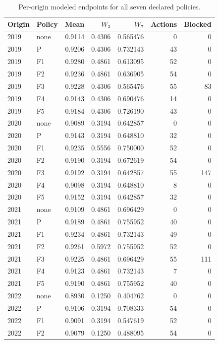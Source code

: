 \begin{table}[!tbp]
\centering
\caption{Per-origin modeled endpoints for all seven declared policies.}\label{sup:r2-perorigin}
\scriptsize
\setlength{\tabcolsep}{4pt}
\begin{tabular}{@{}llrrrrr@{}}
\toprule
Origin & Policy & Mean & $W_3$ & $W_7$ & Actions & Blocked \\
\midrule
2019 & none & 0.9114 & 0.4306 & 0.565476 & 0 & 0 \\
2019 & P & 0.9206 & 0.4306 & 0.732143 & 43 & 0 \\
2019 & F1 & 0.9280 & 0.4861 & 0.613095 & 52 & 0 \\
2019 & F2 & 0.9236 & 0.4861 & 0.636905 & 54 & 0 \\
2019 & F3 & 0.9228 & 0.4306 & 0.565476 & 55 & 83 \\
2019 & F4 & 0.9143 & 0.4306 & 0.690476 & 14 & 0 \\
2019 & F5 & 0.9184 & 0.4306 & 0.726190 & 43 & 0 \\
2020 & none & 0.9089 & 0.3194 & 0.642857 & 0 & 0 \\
2020 & P & 0.9143 & 0.3194 & 0.648810 & 32 & 0 \\
2020 & F1 & 0.9235 & 0.5556 & 0.750000 & 52 & 0 \\
2020 & F2 & 0.9190 & 0.3194 & 0.672619 & 54 & 0 \\
2020 & F3 & 0.9192 & 0.3194 & 0.642857 & 55 & 147 \\
2020 & F4 & 0.9098 & 0.3194 & 0.648810 & 8 & 0 \\
2020 & F5 & 0.9152 & 0.3194 & 0.642857 & 32 & 0 \\
2021 & none & 0.9109 & 0.4861 & 0.696429 & 0 & 0 \\
2021 & P & 0.9189 & 0.4861 & 0.755952 & 40 & 0 \\
2021 & F1 & 0.9234 & 0.4861 & 0.732143 & 49 & 0 \\
2021 & F2 & 0.9261 & 0.5972 & 0.755952 & 52 & 0 \\
2021 & F3 & 0.9225 & 0.4861 & 0.696429 & 55 & 111 \\
2021 & F4 & 0.9123 & 0.4861 & 0.732143 & 7 & 0 \\
2021 & F5 & 0.9190 & 0.4861 & 0.755952 & 40 & 0 \\
2022 & none & 0.8930 & 0.1250 & 0.404762 & 0 & 0 \\
2022 & P & 0.9106 & 0.3194 & 0.708333 & 54 & 0 \\
2022 & F1 & 0.9091 & 0.3194 & 0.547619 & 52 & 0 \\
2022 & F2 & 0.9079 & 0.1250 & 0.488095 & 54 & 0 \\

\end{tabular}
\end{table}
